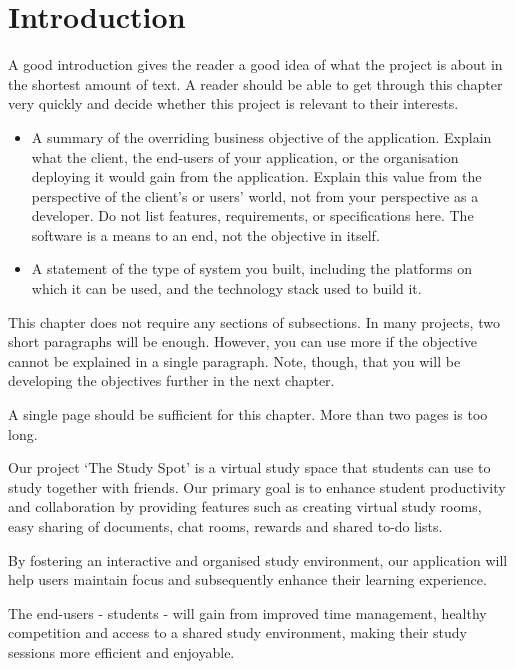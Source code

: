 \chapter{Introduction}
\label{chap:introduction}


\begin{expectations}
A good introduction gives the reader a good idea of what the project is about in the shortest amount of text.  A reader should be able to get through this chapter very quickly and decide whether this project is relevant to their interests.
\begin{itemize}
\item A summary of the overriding business objective of the application.  Explain what the client, the end-users of your application, or the organisation deploying it would gain from the application.  Explain this value from the perspective of the client's or users' world, not from your perspective as a developer.   Do not list features, requirements, or specifications here.  The software is a means to an end, not the objective in itself.
\item A statement of the type of system you built, including the platforms on which it can be used, and the technology stack used to build it.
\end{itemize}
This chapter does not require any sections of subsections.  In many projects, two short paragraphs will be enough.  However, you can use more if the objective cannot be explained in a single paragraph.  Note, though, that you will be developing the objectives further in the next chapter.

\end{expectations}

\begin{length}
A single page should be sufficient for this chapter.  More than two pages is too long.
\end{length}

 Our project ‘The Study Spot’ is a virtual study space that students can use to study together with friends.
Our primary goal is to enhance student productivity and collaboration by providing features such as creating virtual study rooms, easy sharing of documents, chat rooms, rewards and shared to-do lists.

By fostering an interactive and organised study environment, our application will help users maintain focus and subsequently enhance their learning experience.

The end-users - students - will gain from improved time management, healthy competition and access to a shared study environment, making their study sessions more efficient and enjoyable.